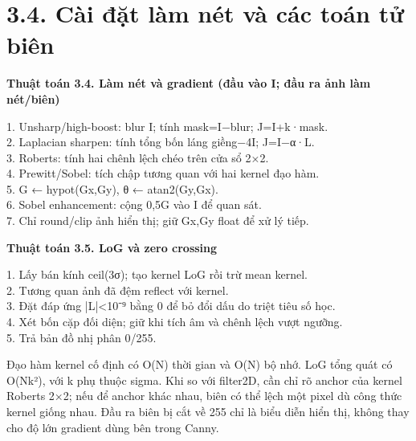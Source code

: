 \documentclass[13pt,a4paper]{extreport}
\begin{document}
\section*{3.4. Cài đặt làm nét và các toán tử biên}
\textbf{Thuật toán 3.4. Làm nét và gradient (đầu vào I; đầu ra ảnh làm nét/biên)}
\begin{flushleft}
1. Unsharp/high-boost: blur I; tính mask=I−blur; J=I+k·mask.\\
2. Laplacian sharpen: tính tổng bốn láng giềng−4I; J=I−α·L.\\
3. Roberts: tính hai chênh lệch chéo trên cửa sổ 2×2.\\
4. Prewitt/Sobel: tích chập tương quan với hai kernel đạo hàm.\\
5. G ← hypot(Gx,Gy), θ ← atan2(Gy,Gx).\\
6. Sobel enhancement: cộng 0,5G vào I để quan sát.\\
7. Chỉ round/clip ảnh hiển thị; giữ Gx,Gy float để xử lý tiếp.\\
\end{flushleft}
\textbf{Thuật toán 3.5. LoG và zero crossing}
\begin{flushleft}
1. Lấy bán kính ceil(3σ); tạo kernel LoG rồi trừ mean kernel.\\
2. Tương quan ảnh đã đệm reflect với kernel.\\
3. Đặt đáp ứng |L|<10⁻⁹ bằng 0 để bỏ đổi dấu do triệt tiêu số học.\\
4. Xét bốn cặp đối diện; giữ khi tích âm và chênh lệch vượt ngưỡng.\\
5. Trả bản đồ nhị phân 0/255.\\
\end{flushleft}
Đạo hàm kernel cố định có O(N) thời gian và O(N) bộ nhớ. LoG tổng quát có O(Nk²), với k phụ thuộc sigma. Khi so với filter2D, cần chỉ rõ anchor của kernel Roberts 2×2; nếu để anchor khác nhau, biên có thể lệch một pixel dù công thức kernel giống nhau. Đầu ra biên bị cắt về 255 chỉ là biểu diễn hiển thị, không thay cho độ lớn gradient dùng bên trong Canny.
\par
\clearpage
\end{document}
